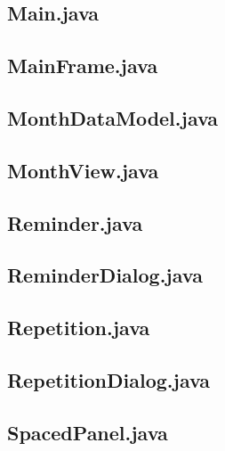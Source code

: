 \documentclass{article}
\begin{document}


\subsection{Main.java}



\subsection{MainFrame.java}



\subsection{MonthDataModel.java}



\subsection{MonthView.java}



\subsection{Reminder.java}



\subsection{ReminderDialog.java}



\subsection{Repetition.java}



\subsection{RepetitionDialog.java}



\subsection{SpacedPanel.java}
\end{document}
